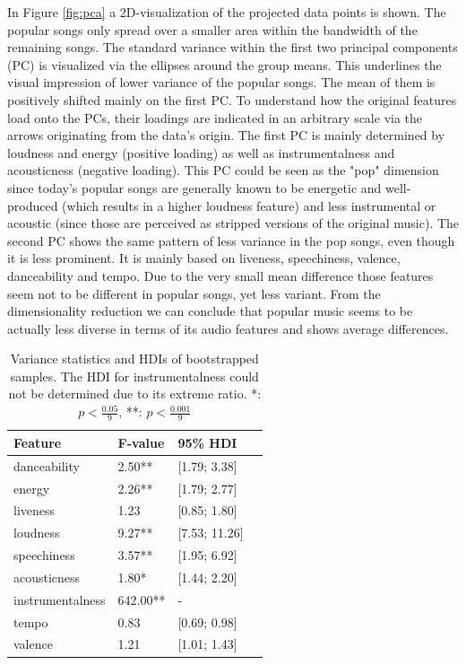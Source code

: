 \documentclass{article}
\begin{document}
In Figure \ref{fig:pca} a 2D-visualization of the projected data points is shown. The popular songs only spread over a smaller area within the bandwidth of the remaining songs. The standard variance within the first two principal components (PC) is visualized via the ellipses around the group means. This underlines the visual impression of lower variance of the popular songs. The mean of them is positively shifted mainly on the first PC. To understand how the original features load onto the PCs, their loadings are indicated in an arbitrary scale via the arrows originating from the data's origin. The first PC is mainly determined by loudness and energy (positive loading) as well as instrumentalness and acousticness (negative loading). This PC could be seen as the "pop" dimension since today's popular songs are generally known to be energetic and well-produced (which results in a higher loudness feature) and less instrumental or acoustic (since those are perceived as stripped versions of the original music). The second PC shows the same pattern of less variance in the pop songs, even though it is less prominent. It is mainly based on liveness, speechiness, valence, danceability and tempo. Due to the very small mean difference those features seem not to be different in popular songs, yet less variant. From the dimensionality reduction we can conclude that popular music seems to be actually less diverse in terms of its audio features and shows average differences.

\begin{table}[h!]
  
  \label{tab:var}
  \centering
  \begin{tabular}{lllc}
    \toprule
    Feature     & F-value & 95\% HDI\\
    \midrule
	danceability        	&  2.50** & [1.79; 3.38]\\
	energy              		&  2.26** & [1.79; 2.77]\\
	liveness            		&  1.23   & [0.85; 1.80]\\
	loudness            	&  9.27** & [7.53; 11.26]\\
	speechiness         	&  3.57** & [1.95; 6.92]\\
	acousticness        	&  1.80*  & [1.44; 2.20]\\
	instrumentalness    	&642.00** & -\\
	tempo               		&  0.83   & [0.69; 0.98]\\
	valence             	&  1.21   & [1.01; 1.43]\\
    \bottomrule
  \end{tabular}
\vspace*{2mm}
  \caption{Variance statistics and HDIs of bootstrapped samples. The HDI for instrumentalness could not be determined due to its extreme ratio. *: $p<\frac{0.05}{9}$, **: $p<\frac{0.001}{9}$}
  \vspace*{-5mm}
\end{table}
\end{document}
